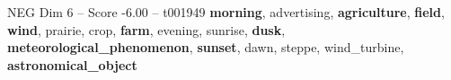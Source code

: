 \begin{textsample}{NEG Dim 6 – Score -6.00 – t001949}  \label{ex:f6_neg_030}
\textbf{morning}, advertising, \textbf{agriculture}, \textbf{field}, \textbf{wind}, prairie, crop, \textbf{farm}, evening, sunrise, \textbf{dusk}, \textbf{meteorological\_phenomenon}, \textbf{sunset}, dawn, steppe, wind\_turbine, \textbf{astronomical\_object}

\end{textsample}
